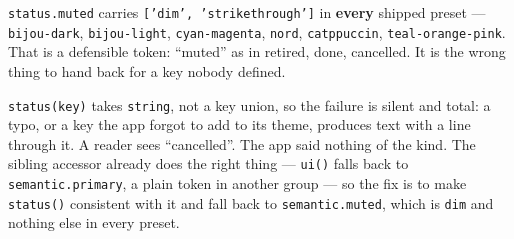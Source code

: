 \texttt{s\allowbreak{}t\allowbreak{}a\allowbreak{}t\allowbreak{}u\allowbreak{}s\allowbreak{}.\allowbreak{}m\allowbreak{}u\allowbreak{}t\allowbreak{}e\allowbreak{}d} carries \texttt{[\allowbreak{}'\allowbreak{}d\allowbreak{}i\allowbreak{}m\allowbreak{}'\allowbreak{},\allowbreak{} \allowbreak{}'\allowbreak{}s\allowbreak{}t\allowbreak{}r\allowbreak{}i\allowbreak{}k\allowbreak{}e\allowbreak{}t\allowbreak{}h\allowbreak{}r\allowbreak{}o\allowbreak{}u\allowbreak{}g\allowbreak{}h\allowbreak{}'\allowbreak{}]} in \textbf{every} shipped preset --- \texttt{b\allowbreak{}i\allowbreak{}j\allowbreak{}o\allowbreak{}u\allowbreak{}-\allowbreak{}d\allowbreak{}a\allowbreak{}r\allowbreak{}k}, \texttt{b\allowbreak{}i\allowbreak{}j\allowbreak{}o\allowbreak{}u\allowbreak{}-\allowbreak{}l\allowbreak{}i\allowbreak{}g\allowbreak{}h\allowbreak{}t}, \texttt{c\allowbreak{}y\allowbreak{}a\allowbreak{}n\allowbreak{}-\allowbreak{}m\allowbreak{}a\allowbreak{}g\allowbreak{}e\allowbreak{}n\allowbreak{}t\allowbreak{}a}, \texttt{n\allowbreak{}o\allowbreak{}r\allowbreak{}d}, \texttt{c\allowbreak{}a\allowbreak{}t\allowbreak{}p\allowbreak{}p\allowbreak{}u\allowbreak{}c\allowbreak{}c\allowbreak{}i\allowbreak{}n}, \texttt{t\allowbreak{}e\allowbreak{}a\allowbreak{}l\allowbreak{}-\allowbreak{}o\allowbreak{}r\allowbreak{}a\allowbreak{}n\allowbreak{}g\allowbreak{}e\allowbreak{}-\allowbreak{}p\allowbreak{}i\allowbreak{}n\allowbreak{}k}. That is a defensible token: ``muted'' as in retired, done, cancelled. It is the wrong thing to hand back for a key nobody defined.

\texttt{s\allowbreak{}t\allowbreak{}a\allowbreak{}t\allowbreak{}u\allowbreak{}s\allowbreak{}(\allowbreak{}k\allowbreak{}e\allowbreak{}y\allowbreak{})} takes \texttt{s\allowbreak{}t\allowbreak{}r\allowbreak{}i\allowbreak{}n\allowbreak{}g}, not a key union, so the failure is silent and total: a typo, or a key the app forgot to add to its theme, produces text with a line through it. A reader sees ``cancelled''. The app said nothing of the kind. The sibling accessor already does the right thing --- \texttt{u\allowbreak{}i\allowbreak{}(\allowbreak{})} falls back to \texttt{s\allowbreak{}e\allowbreak{}m\allowbreak{}a\allowbreak{}n\allowbreak{}t\allowbreak{}i\allowbreak{}c\allowbreak{}.\allowbreak{}p\allowbreak{}r\allowbreak{}i\allowbreak{}m\allowbreak{}a\allowbreak{}r\allowbreak{}y}, a plain token in another group --- so the fix is to make \texttt{s\allowbreak{}t\allowbreak{}a\allowbreak{}t\allowbreak{}u\allowbreak{}s\allowbreak{}(\allowbreak{})} consistent with it and fall back to \texttt{s\allowbreak{}e\allowbreak{}m\allowbreak{}a\allowbreak{}n\allowbreak{}t\allowbreak{}i\allowbreak{}c\allowbreak{}.\allowbreak{}m\allowbreak{}u\allowbreak{}t\allowbreak{}e\allowbreak{}d}, which is \texttt{d\allowbreak{}i\allowbreak{}m} and nothing else in every preset.


